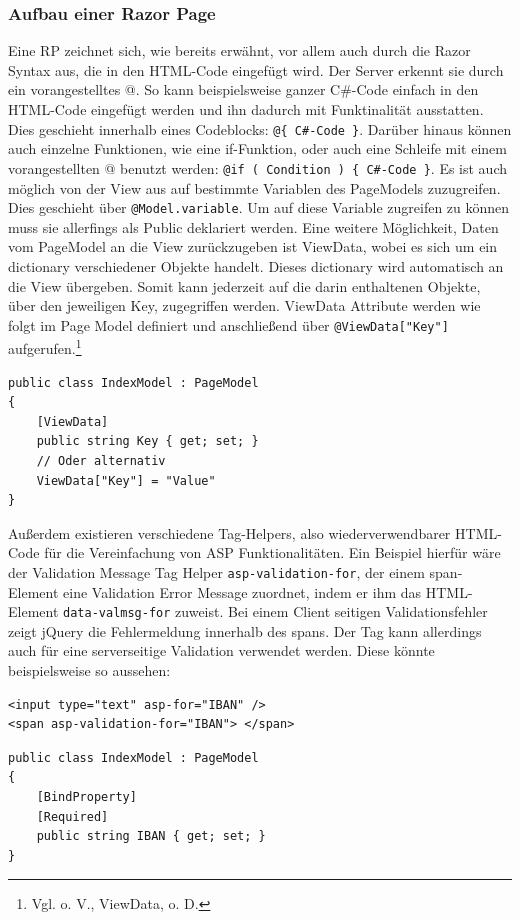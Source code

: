 \documentclass[a4paper,
12pt,
oneside]
{article}
\begin{document}
	\subsubsection{Aufbau einer Razor Page}
	Eine RP zeichnet sich, wie bereits erwähnt, vor allem auch durch die Razor Syntax aus, die in den HTML-Code eingefügt wird. Der Server erkennt sie durch ein vorangestelltes \glqq @\grqq. So kann beispielsweise ganzer C\#-Code einfach in den HTML-Code eingefügt werden und ihn dadurch mit Funktinalität ausstatten. Dies geschieht innerhalb eines Codeblocks: \texttt{@\{ C\#-Code \}}. Darüber hinaus können auch einzelne Funktionen, wie eine if-Funktion, oder auch eine Schleife mit einem vorangestellten @ benutzt werden: \texttt{@if ( Condition ) \{ C\#-Code \}}. Es ist auch möglich von der View aus auf bestimmte Variablen des PageModels zuzugreifen. Dies geschieht über \texttt{@Model.variable}. Um auf diese Variable zugreifen zu können muss sie allerfings als Public deklariert werden. Eine weitere Möglichkeit, Daten vom PageModel an die View zurückzugeben ist ViewData, wobei es sich um ein dictionary verschiedener Objekte handelt. Dieses dictionary wird automatisch an die View übergeben. Somit kann jederzeit auf die darin enthaltenen Objekte, über den jeweiligen Key, zugegriffen werden. ViewData Attribute werden wie folgt im Page Model definiert und anschließend über \texttt{@ViewData["Key"]} aufgerufen.\footnote{Vgl. o. V., ViewData, o. D.}
	\lstset{style=csharp}
	\begin{lstlisting}
public class IndexModel : PageModel
{
	[ViewData]
	public string Key { get; set; }
	// Oder alternativ
	ViewData["Key"] = "Value"
}
	\end{lstlisting}
	Außerdem existieren verschiedene Tag-Helpers, also wiederverwendbarer HTML-Code für die Vereinfachung von ASP Funktionalitäten. Ein Beispiel hierfür wäre der Validation Message Tag Helper \texttt{asp-validation-for}, der einem span-Element eine Validation Error Message zuordnet, indem er ihm das HTML-Element \texttt{data-valmsg-for} zuweist. Bei einem Client seitigen Validationsfehler zeigt jQuery die Fehlermeldung innerhalb des spans. Der Tag kann allerdings auch für eine serverseitige Validation verwendet werden. Diese könnte beispielsweise so aussehen: 
	\lstset{style=cshtml}
	\begin{lstlisting}
<input type="text" asp-for="IBAN" />
<span asp-validation-for="IBAN"> </span>
	\end{lstlisting}
	\lstset{style=csharp}
	\begin{lstlisting}
public class IndexModel : PageModel
{
	[BindProperty]
	[Required]
	public string IBAN { get; set; }
}
	\end{lstlisting}
\end{document}
